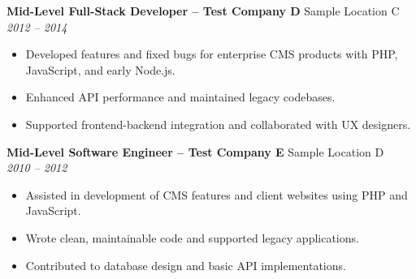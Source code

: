 \documentclass[a4paper,10pt]{article}
\begin{document}
	\textbf{Mid-Level Full-Stack Developer – Test Company D} \hfill Sample Location C \\
	\textit{2012 -- 2014}
	\begin{itemize}
		\item Developed features and fixed bugs for enterprise CMS products with PHP, JavaScript, and early Node.js.
		\item Enhanced API performance and maintained legacy codebases.
		\item Supported frontend-backend integration and collaborated with UX designers.
	\end{itemize}
	
	\textbf{Mid-Level Software Engineer – Test Company E} \hfill Sample Location D \\
	\textit{2010 -- 2012}
	\begin{itemize}
		\item Assisted in development of CMS features and client websites using PHP and JavaScript.
		\item Wrote clean, maintainable code and supported legacy applications.
		\item Contributed to database design and basic API implementations.
	\end{itemize}
	
\end{document}
